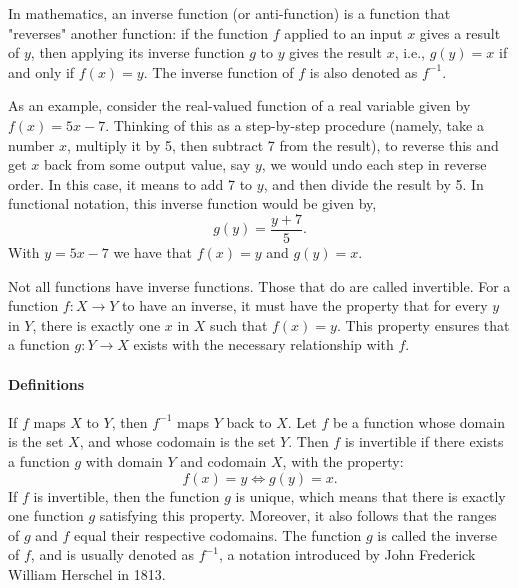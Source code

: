 In mathematics, an inverse function (or anti-function) is a function that "reverses" another function: if the function $f$ applied to an input $x$ gives a result of $y$, then applying its inverse function $g$ to $y$ gives the result $x$, i.e., $g(y) = x$ if and only if $f(x) = y$. The inverse function of $f$ is also denoted as $f^{-1}$.

As an example, consider the real-valued function of a real variable given by $f(x) = 5x - 7$. Thinking of this as a step-by-step procedure (namely, take a number $x$, multiply it by 5, then subtract 7 from the result), to reverse this and get $x$ back from some output value, say $y$, we would undo each step in reverse order. In this case, it means to add 7 to $y$, and then divide the result by 5. In functional notation, this inverse function would be given by,
$$
g(y) = \frac{y + 7}{5}.
$$
With $y = 5x - 7$ we have that $f(x) = y$ and $g(y) = x$.

Not all functions have inverse functions. Those that do are called invertible. For a function $f: X \to Y$ to have an inverse, it must have the property that for every $y$ in $Y$, there is exactly one $x$ in $X$ such that $f(x) = y$. This property ensures that a function $g: Y \to X$ exists with the necessary relationship with $f$.

\paragraph{Definitions}

If $f$ maps $X$ to $Y$, then $f^{-1}$ maps $Y$ back to $X$.
Let $f$ be a function whose domain is the set $X$, and whose codomain is the set $Y$. Then $f$ is invertible if there exists a function $g$ with domain $Y$ and codomain $X$, with the property:
$$
f(x) = y \Leftrightarrow g(y) = x.
$$
If $f$ is invertible, then the function $g$ is unique, which means that there is exactly one function $g$ satisfying this property. Moreover, it also follows that the ranges of $g$ and $f$ equal their respective codomains. The function $g$ is called the inverse of $f$, and is usually denoted as $f^{-1}$, a notation introduced by John Frederick William Herschel in 1813.

